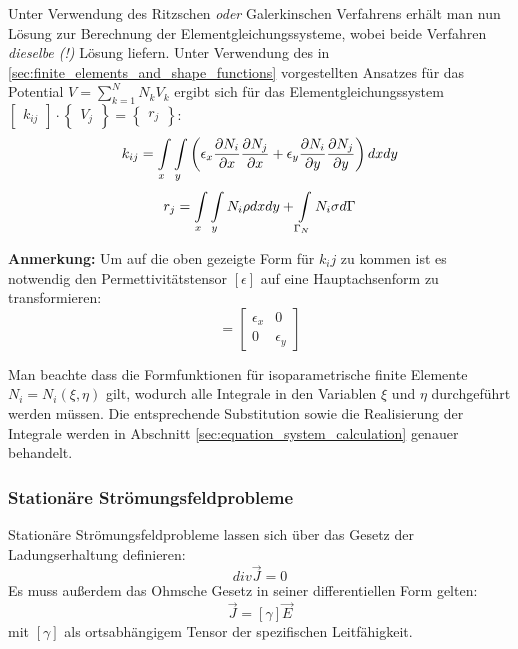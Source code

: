 Unter Verwendung des Ritzschen \textit{oder} Galerkinschen Verfahrens erhält man nun Lösung zur Berechnung der Elementgleichungssysteme, wobei beide Verfahren \textit{dieselbe (!)} Lösung liefern. Unter Verwendung des in \ref{sec:finite_elements_and_shape_functions} vorgestellten Ansatzes für das Potential $V = \sum_{k = 1}^{N} N_k V_k$ ergibt sich für das Elementgleichungssystem $\begin{bmatrix}k_{ij}\end{bmatrix} \cdot \begin{Bmatrix}V_j\end{Bmatrix} = \begin{Bmatrix}r_j\end{Bmatrix}$:
\begin{equation}
\label{eq:k_ij_e_static}
k_{ij} = \int\displaylimits_{x} \int\displaylimits_{y} \left(\epsilon_x \frac{\partial N_i}{\partial x}\frac{\partial N_j}{\partial x} +  \epsilon_y\frac{\partial N_i}{\partial y}\frac{\partial N_j}{\partial y}\right)dx dy
\end{equation}
\begin{equation}
\label{eq:right_side_e_static}
	r_j = \int\displaylimits_{x} \int\displaylimits_{y} N_i \rho dx dy + \int\displaylimits_{\Gamma_N} N_i\sigma d\Gamma
\end{equation}

\textbf{Anmerkung:} Um auf die oben gezeigte Form für $k_ij$ zu kommen ist es notwendig den Permettivitätstensor $[\epsilon]$ auf eine Hauptachsenform zu transformieren:
\begin{equation*}
	[\epsilon] = \begin{bmatrix}
	\epsilon_x & 0 \\
	0 & \epsilon_y
	\end{bmatrix}
\end{equation*}

Man beachte dass die Formfunktionen für isoparametrische finite Elemente $N_i = N_i(\xi, \eta)$ gilt, wodurch alle Integrale in den Variablen $\xi$ und $\eta$ durchgeführt werden müssen. Die entsprechende Substitution sowie die Realisierung der Integrale werden in Abschnitt \ref{sec:equation_system_calculation} genauer behandelt. 


\subsubsection{Stationäre Strömungsfeldprobleme}
Stationäre Strömungsfeldprobleme lassen sich über das Gesetz der Ladungserhaltung definieren:
\begin{equation}
	\mathit{div}\vec{J} = 0
\end{equation}
 Es muss außerdem das Ohmsche Gesetz in seiner differentiellen Form gelten:
 \begin{equation}
 	\vec{J} = [\gamma] \vec{E}
 \end{equation}
 mit $[\gamma]$ als ortsabhängigem Tensor der spezifischen Leitfähigkeit.\newline
 
